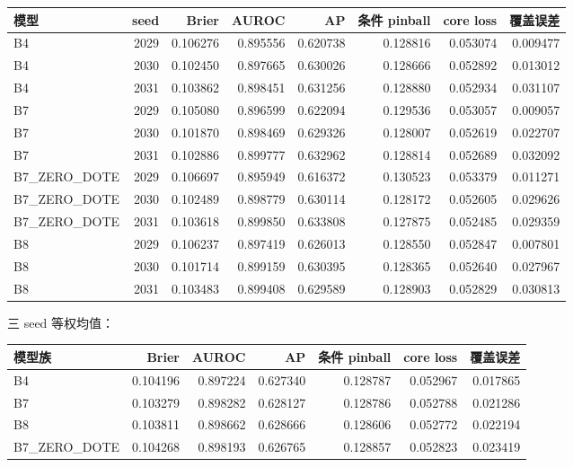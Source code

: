 \documentclass[UTF8,a4paper,fontset=windows,11pt]{ctexart}
\begin{document}
\begin{center}
{\footnotesize
\begin{longtable}{lrrrrrrr}
\toprule
模型 & seed & Brier & AUROC & AP & 条件 pinball & core loss & 覆盖误差 \\
\midrule
B4 & 2029 & 0.106276 & 0.895556 & 0.620738 & 0.128816 & 0.053074 & 0.009477 \\
B4 & 2030 & 0.102450 & 0.897665 & 0.630026 & 0.128666 & 0.052892 & 0.013012 \\
B4 & 2031 & 0.103862 & 0.898451 & 0.631256 & 0.128880 & 0.052934 & 0.031107 \\
B7 & 2029 & 0.105080 & 0.896599 & 0.622094 & 0.129536 & 0.053057 & 0.009057 \\
B7 & 2030 & 0.101870 & 0.898469 & 0.629326 & 0.128007 & 0.052619 & 0.022707 \\
B7 & 2031 & 0.102886 & 0.899777 & 0.632962 & 0.128814 & 0.052689 & 0.032092 \\
B7\_ZERO\_DOTE & 2029 & 0.106697 & 0.895949 & 0.616372 & 0.130523 & 0.053379 & 0.011271 \\
B7\_ZERO\_DOTE & 2030 & 0.102489 & 0.898779 & 0.630114 & 0.128172 & 0.052605 & 0.029626 \\
B7\_ZERO\_DOTE & 2031 & 0.103618 & 0.899850 & 0.633808 & 0.127875 & 0.052485 & 0.029359 \\
B8 & 2029 & 0.106237 & 0.897419 & 0.626013 & 0.128550 & 0.052847 & 0.007801 \\
B8 & 2030 & 0.101714 & 0.899159 & 0.630395 & 0.128365 & 0.052640 & 0.027967 \\
B8 & 2031 & 0.103483 & 0.899408 & 0.629589 & 0.128903 & 0.052829 & 0.030813 \\
\bottomrule
\end{longtable}
}
\end{center}

三 seed 等权均值：

\begin{center}
{\footnotesize
\begin{longtable}{lrrrrrr}
\toprule
模型族 & Brier & AUROC & AP & 条件 pinball & core loss & 覆盖误差 \\
\midrule
B4 & 0.104196 & 0.897224 & 0.627340 & 0.128787 & 0.052967 & 0.017865 \\
B7 & 0.103279 & 0.898282 & 0.628127 & 0.128786 & 0.052788 & 0.021286 \\
B8 & 0.103811 & 0.898662 & 0.628666 & 0.128606 & 0.052772 & 0.022194 \\
B7\_ZERO\_DOTE & 0.104268 & 0.898193 & 0.626765 & 0.128857 & 0.052823 & 0.023419 \\
\bottomrule
\end{longtable}
}
\end{center}
\end{document}
